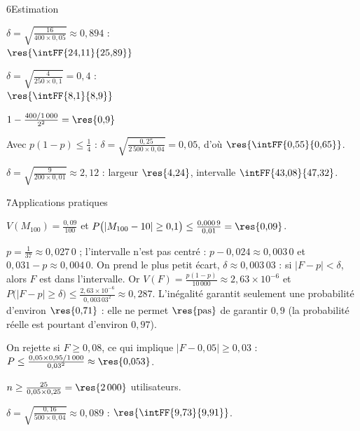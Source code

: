 \begin{deuxcolonnes}
\begin{corrige}{6}{Estimation}
\begin{questions}
  \item $\delta=\sqrt{\frac{16}{400\times0{,}05}}\approx0{,}894$ :\\ $\res{\intFF{24{,}11}{25{,}89}}$
  \item $\delta=\sqrt{\frac{4}{250\times0{,}1}}=0{,}4$ :\\ $\res{\intFF{8{,}1}{8{,}9}}$
  \item $1-\frac{400/1\,000}{2^{2}}=\res{0{,}9}$
  \item Avec $p(1-p)\leq\frac14$ : $\delta=\sqrt{\frac{0{,}25}{2\,500\times0{,}04}}=0{,}05$, d'où $\res{\intFF{0{,}55}{0{,}65}}$.
  \item $\delta=\sqrt{\frac{9}{200\times0{,}01}}\approx2{,}12$ : largeur $\res{4{,}24}$, intervalle $\intFF{43{,}08}{47{,}32}$.
\end{questions}
\end{corrige}

\end{deuxcolonnes}

\begin{corrige}{7}{Applications pratiques}
\begin{questions}
  \item $V(M_{100})=\frac{0{,}09}{100}$ et $P\big(|M_{100}-10|\geq0{,}1\big)\leq\frac{0{,}000\,9}{0{,}01}=\res{0{,}09}$.
  \item $p=\frac1{37}\approx0{,}027\,0$ ; l'intervalle n'est pas centré : $p-0{,}024\approx0{,}003\,0$ et $0{,}031-p\approx0{,}004\,0$. On prend le
    plus petit écart, $\delta\approx0{,}003\,03$ : si $|F-p|<\delta$, alors $F$ est dans l'intervalle. Or $V(F)=\frac{p(1-p)}{10\,000}\approx2{,}63\times10^{-6}$
    et $P\big(|F-p|\geq\delta\big)\leq\frac{2{,}63\times10^{-6}}{0{,}003\,03^{2}}\approx0{,}287$. L'inégalité garantit seulement une probabilité
    d'environ $\res{0{,}71}$ : elle ne permet $\res{\text{pas}}$ de garantir $0{,}9$ (la probabilité réelle est pourtant d'environ $0{,}97$).
  \item On rejette si $F\geq0{,}08$, ce qui implique $|F-0{,}05|\geq0{,}03$ : $P\leq\frac{0{,}05\times0{,}95/1\,000}{0{,}03^{2}}\approx\res{0{,}053}$.
  \item $n\geq\frac{25}{0{,}05\times0{,}25}=\res{2\,000}$ utilisateurs.
  \item $\delta=\sqrt{\frac{0{,}16}{500\times0{,}04}}\approx0{,}089$ : $\res{\intFF{9{,}73}{9{,}91}}$.
\end{questions}
\end{corrige}

